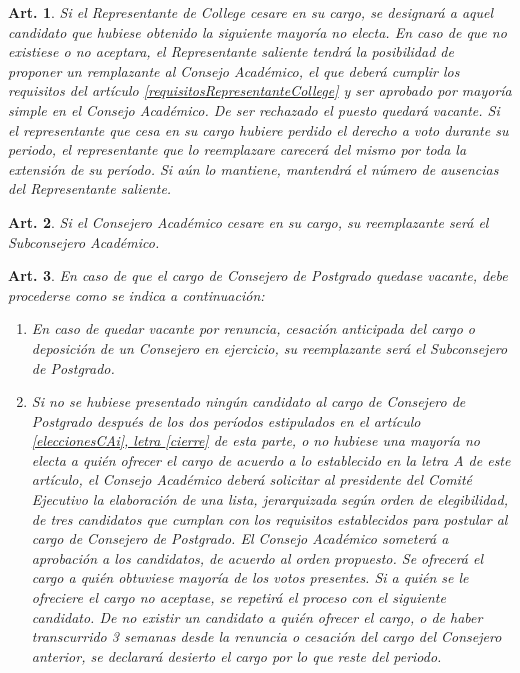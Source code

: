 \documentclass[letterpaper,11pt]{article}
\theoremstyle{plain}
\newtheorem{art}{Art.} %
\newcommand{\aaref}[2]{\hyperref[#2]{\ref*{#1}, letra \ref*{#2}}}
\begin{document}
		\begin{art}
			Si el Representante de College cesare en su cargo, se designará a aquel candidato que hubiese obtenido la siguiente mayoría no electa. En caso de que no existiese o no aceptara, el Representante saliente tendrá la posibilidad de proponer un remplazante al Consejo Académico, el que deberá cumplir los requisitos del artículo \ref{requisitosRepresentanteCollege} y ser aprobado por mayoría simple en el Consejo Académico. De ser rechazado el puesto quedará vacante. Si el representante que cesa en su cargo hubiere perdido el derecho a voto durante su periodo, el representante que lo reemplazare carecerá del mismo por toda la extensión de su período. Si aún lo mantiene, mantendrá el número de ausencias del Representante saliente.
		\end{art}

		\begin{art}\label{reemplazoCA}
			Si el Consejero Académico cesare en su cargo, su reemplazante será el Subconsejero Académico.
		\end{art}

		\begin{art} \label{eleccionExtraordinariaCAPostgrado}
			En caso de que el cargo de Consejero de Postgrado quedase vacante, debe procederse como se indica a continuación:
			\begin{enumerate}
				\item\label{cp_renuncia} En caso de quedar vacante por renuncia, cesación anticipada del cargo o deposición de un Consejero en ejercicio, su reemplazante será el Subconsejero de Postgrado.
				
				\item Si no se hubiese presentado ningún candidato al cargo de Consejero de Postgrado después de los dos períodos estipulados en el artículo \aaref{eleccionesCAi}{cierre} de esta parte, o no hubiese una mayoría no electa a quién ofrecer el cargo de acuerdo a lo establecido en la letra A de este artículo, el Consejo Académico deberá solicitar al presidente del Comité Ejecutivo la elaboración de una lista, jerarquizada según orden de elegibilidad, de tres candidatos que cumplan con los requisitos establecidos para postular al cargo de Consejero de Postgrado. El Consejo Académico someterá a aprobación a los candidatos, de acuerdo al orden propuesto. Se ofrecerá el cargo a quién obtuviese mayoría de los votos presentes. Si a quién se le ofreciere el cargo no aceptase, se repetirá el proceso con el siguiente candidato. De no existir un candidato a quién ofrecer el cargo, o de haber transcurrido 3 semanas desde la renuncia o cesación del cargo del Consejero anterior, se declarará desierto el cargo por lo que reste del periodo.
			\end{enumerate}
		\end{art}
\end{document}

